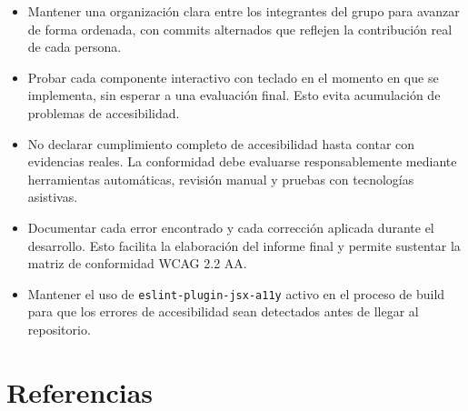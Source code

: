 \documentclass[12pt, a4paper]{article}
\begin{document}
\begin{itemize}
  \item Mantener una organización clara entre los integrantes del grupo para avanzar de forma ordenada, con commits alternados que reflejen la contribución real de cada persona.

  \item Probar cada componente interactivo con teclado en el momento en que se implementa, sin esperar a una evaluación final. Esto evita acumulación de problemas de accesibilidad.

  \item No declarar cumplimiento completo de accesibilidad hasta contar con evidencias reales. La conformidad debe evaluarse responsablemente mediante herramientas automáticas, revisión manual y pruebas con tecnologías asistivas.

  \item Documentar cada error encontrado y cada corrección aplicada durante el desarrollo. Esto facilita la elaboración del informe final y permite sustentar la matriz de conformidad WCAG 2.2 AA.

  \item Mantener el uso de \texttt{eslint-plugin-jsx-a11y} activo en el proceso de build para que los errores de accesibilidad sean detectados antes de llegar al repositorio.
\end{itemize}

\section*{Referencias}
\end{document}
